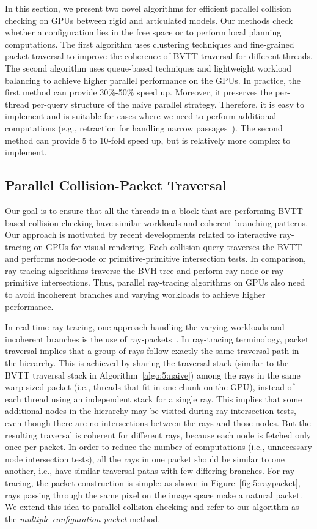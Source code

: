 In this section, we present two novel algorithms for efficient parallel collision checking on GPUs between rigid and articulated models. Our methods check whether a configuration lies in the free space or to perform local planning computations. The first algorithm uses clustering techniques and fine-grained packet-traversal to improve the
coherence of BVTT traversal for different threads. The second algorithm uses queue-based techniques and lightweight workload
balancing to achieve higher parallel performance on the GPUs. In practice, the first method can provide 30\%-50\% speed up.
Moreover, it preserves the per-thread per-query structure of the naive parallel strategy. Therefore, it is easy to implement
and is suitable for cases where we need to perform additional computations (e.g., retraction for handling narrow passages~\cite{Zhang08-ICRA}). The second method can provide 5 to 10-fold speed up, but is relatively more complex to implement.


\subsection{Parallel Collision-Packet Traversal}
\label{sec:5:algorithm:packet}
Our goal is to ensure that all the threads in a block that are performing BVTT-based collision checking have similar workloads and coherent
branching patterns. Our approach is motivated by recent developments related to interactive ray-tracing on GPUs for visual
rendering. Each collision query traverses the BVTT and performs node-node or primitive-primitive intersection tests. In comparison,
ray-tracing algorithms traverse the BVH tree and perform ray-node or ray-primitive intersections. Thus, parallel ray-tracing
algorithms on GPUs also need to avoid incoherent branches and varying workloads to achieve higher performance.

In real-time ray tracing, one approach handling the varying workloads and incoherent branches is the
use of ray-packets~\cite{Gunther07,Aila2009}. In ray-tracing terminology, packet traversal implies that a group of
rays follow
exactly the same traversal path in the hierarchy. This is achieved by sharing the traversal stack (similar to the BVTT traversal stack in Algorithm~\ref{algo:5:naive}) among the rays in the same warp-sized packet (i.e., threads that fit in one chunk on the GPU), instead of each thread using an independent stack for a single ray.
This implies that some additional nodes in the hierarchy may be visited during ray intersection tests, even though there are no intersections between the rays and those nodes. But the resulting traversal is coherent for different rays, because each node is fetched only once per packet. In order to reduce the number of computations (i.e., unnecessary node intersection tests), all the rays in one packet should be similar to one another, i.e., have similar traversal paths with few differing branches. For ray tracing, the packet construction is simple: as shown in Figure~\ref{fig:5:raypacket}, rays passing through the same pixel on the image space make a natural packet. We extend this idea to parallel collision checking and refer to our algorithm as the \emph{multiple configuration-packet} method.

